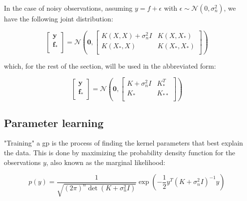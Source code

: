 In the case of noisy observations, assuming $y = f + \epsilon$  with $\epsilon
\sim \mathcal{N}(0, \sigma_n^2)$, we have the following joint distribution:

\begin{equation}
    \begin{bmatrix}
        \mathbf{y} \\
        \mathbf{f_*} \\
    \end{bmatrix} = 
    \mathcal{N}\left(
        \mathbf{0}, 
        \begin{bmatrix}
            K(X, X) + \sigma_n^2 I& K(X, X_*) \\
            K(X_*, X) & K(X_*, X_*) \\
        \end{bmatrix}
    \right)
\end{equation}

which, for the rest of the section, will be used in the abbreviated form:

\begin{equation}
    \begin{bmatrix}
        \mathbf{y} \\
        \mathbf{f_*} \\
    \end{bmatrix} = 
    \mathcal{N}\left(
        \mathbf{0}, 
        \begin{bmatrix}
            K + \sigma_n^2 I& K_*^T \\
            K_* & K_{**} \\
        \end{bmatrix}
    \right)
\end{equation}


\subsection{Parameter learning}

"Training" a \acrshort{gp} is the process of finding the kernel parameters that
best explain the data. This is done by maximizing the probability density
function for the observations $y$, also known as the marginal likelihood:

\begin{equation}\label{eq:gp_likelihood}
    p(y) = \frac{1}{\sqrt{(2\pi)^{n}\det{\left(K + \sigma_n^2I\right)}}}
    \exp{\left(-\frac{1}{2}y^T\left(K + \sigma_n^2I\right)^{-1}y\right)}
\end{equation}

